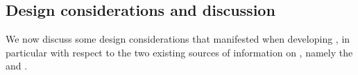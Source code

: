 

\subsection{Design considerations and discussion}\label{subsec:discussion}

We now discuss some design considerations that manifested when developing 
\gcoql, in particular with respect to the two existing sources of information on \gql, namely the \spec and \HP.


